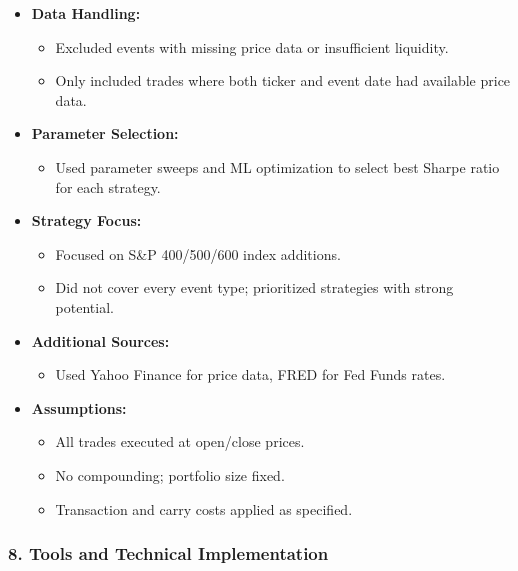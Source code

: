 \documentclass[11pt]{article}
\providecommand{\tightlist}{%
      \setlength{\itemsep}{0pt}\setlength{\parskip}{0pt}}
\begin{document}
\begin{itemize}
\tightlist
\item
  \textbf{Data Handling:}

  \begin{itemize}
  \tightlist
  \item
    Excluded events with missing price data or insufficient liquidity.
  \item
    Only included trades where both ticker and event date had available
    price data.
  \end{itemize}
\item
  \textbf{Parameter Selection:}

  \begin{itemize}
  \tightlist
  \item
    Used parameter sweeps and ML optimization to select best Sharpe
    ratio for each strategy.
  \end{itemize}
\item
  \textbf{Strategy Focus:}

  \begin{itemize}
  \tightlist
  \item
    Focused on S\&P 400/500/600 index additions.
  \item
    Did not cover every event type; prioritized strategies with strong
    potential.
  \end{itemize}
\item
  \textbf{Additional Sources:}

  \begin{itemize}
  \tightlist
  \item
    Used Yahoo Finance for price data, FRED for Fed Funds rates.
  \end{itemize}
\item
  \textbf{Assumptions:}

  \begin{itemize}
  \tightlist
  \item
    All trades executed at open/close prices.
  \item
    No compounding; portfolio size fixed.
  \item
    Transaction and carry costs applied as specified.
  \end{itemize}
\end{itemize}

\subsubsection*{8. Tools and Technical Implementation}
\end{document}
